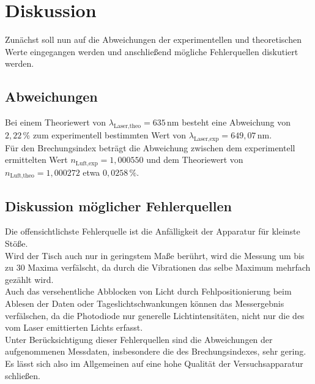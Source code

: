 \section{Diskussion}
\label{sec:Diskussion}

Zunächst soll nun auf die Abweichungen der experimentellen und theoretischen Werte eingegangen werden und anschließend mögliche Fehlerquellen diskutiert werden.

\subsection{Abweichungen}

Bei einem Theoriewert von $\lambda_\text{Laser,theo} = 635 \,\si{\nano\meter}$ besteht eine Abweichung von $2,22 \,\%$ zum experimentell bestimmten Wert von
$\lambda_\text{Laser,exp} = 649,07\,\si{\nano\meter}$. \\

Für den Brechungsindex beträgt die Abweichung zwischen dem experimentell ermittelten Wert $n_\text{Luft,exp} = 1,000550$ und dem Theoriewert von $n_\text{Luft,theo} = 1,000272$ \cite{spekrumbrechluft} etwa $0,0258 \,\%$. \\


\subsection{Diskussion möglicher Fehlerquellen}

Die offensichtlichste Fehlerquelle ist die Anfälligkeit der Apparatur für kleinste Stöße. \\
Wird der Tisch auch nur in geringstem Maße berührt, wird die Messung um bis zu $30$ Maxima verfälscht, da durch die Vibrationen das selbe Maximum mehrfach gezählt wird. \\

Auch das versehentliche Abblocken von Licht durch Fehlpositionierung beim Ablesen der Daten oder Tageslichtschwankungen können das Messergebnis verfälschen, da die Photodiode nur generelle Lichtintensitäten,
nicht nur die des vom Laser emittierten Lichts erfasst. \\

Unter Berücksichtigung dieser Fehlerquellen sind die Abweichungen der aufgenommenen Messdaten, insbesondere die des Brechungsindexes, sehr gering.
Es lässt sich also im Allgemeinen auf eine hohe Qualität der Versuchsapparatur schließen.
